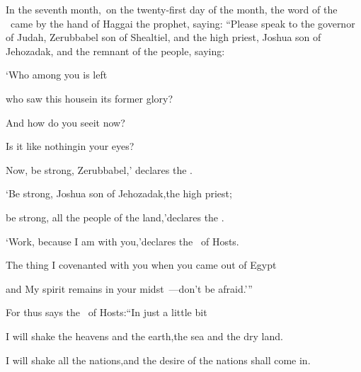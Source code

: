 
\begin{inparaenum}
  \noindent{} In the seventh month,\understood{}\ on the twenty-first day of the month, the word of the \lord\ came by the hand of Haggai the prophet, saying:%
   ``Please speak to the governor of Judah, Zerubbabel son of Shealtiel, and the high priest, Joshua son of Jehozadak, and the remnant of the people, saying:\smallskip%

  \pc{} `Who among you is left%

  \pd{}who saw this house\pa{}in its former glory?%

  \pd{}And how do you see\pa{}it now?%

  \pd{}Is it like nothing\pa{}in your eyes?%

  \pc{} Now, be strong, Zerubbabel,' declares the \lord.%

  \pd{}`Be strong, Joshua son of Jehozadak,\pa{}the high priest;%

  \pd{}be strong, all the people of the land,'\pa{}declares the \lord.%

  \pd{}`Work, because I am with you,'\pa{}declares the \lord\ of Hosts.%

  \pc{}%
  The thing%
  I covenanted with you when you came out of Egypt%

  \pd{}and My spirit remains in your midst~---\pa{}don't be afraid.'\thinspace''\bigskip%

  \pc{} For thus says the \lord\ of Hosts:\pa{}``In just a little bit%

  \pd{}I will shake the heavens and the earth,\pa{}the sea and the dry land.%

  \pc{} I will shake all the nations,\pa{}and the desire of the nations shall come in.%


\end{inparaenum}
